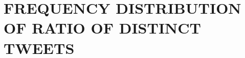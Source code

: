 \documentclass[BTech]{iitddiss}
\newcommand{\eat}[1]{}
\begin{document}
\chapter{FREQUENCY DISTRIBUTION OF RATIO OF DISTINCT TWEETS}
\label{chap:distinct-tweets-ratio}


% 



\begin{singlespace}
  
\end{singlespace}


\eat{%

\listofpapers

\begin{enumerate}
\item Authors....  \newblock
 Title...
  \newblock {\em Journal}, Volume,
  Page, (year).
\end{enumerate}}
\end{document}
